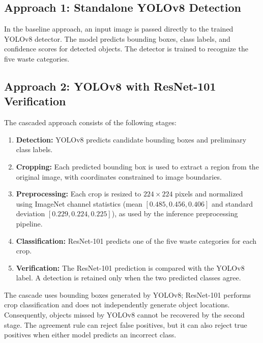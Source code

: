 \documentclass[conference]{IEEEtran}
\begin{document}
\subsection{Approach 1: Standalone YOLOv8 Detection}
In the baseline approach, an input image is passed directly to the trained YOLOv8 detector. The model predicts bounding boxes, class labels, and confidence scores for detected objects. The detector is trained to recognize the five waste categories.

\subsection{Approach 2: YOLOv8 with ResNet-101 Verification}
\label{sec:approach2}
The cascaded approach consists of the following stages:
\begin{enumerate}
  \item \textbf{Detection:} YOLOv8 predicts candidate bounding boxes and preliminary class labels.
  \item \textbf{Cropping:} Each predicted bounding box is used to extract a region from the original image, with coordinates constrained to image boundaries.
  \item \textbf{Preprocessing:} Each crop is resized to $224\times224$ pixels and normalized using ImageNet channel statistics (mean $[0.485,0.456,0.406]$ and standard deviation $[0.229,0.224,0.225]$), as used by the inference preprocessing pipeline.
  \item \textbf{Classification:} ResNet-101 predicts one of the five waste categories for each crop.
  \item \textbf{Verification:} The ResNet-101 prediction is compared with the YOLOv8 label. A detection is retained only when the two predicted classes agree.
\end{enumerate}

The cascade uses bounding boxes generated by YOLOv8; ResNet-101 performs crop classification and does not independently generate object locations. Consequently, objects missed by YOLOv8 cannot be recovered by the second stage. The agreement rule can reject false positives, but it can also reject true positives when either model predicts an incorrect class.
\end{document}
